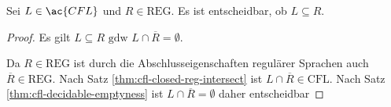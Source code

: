 \begin{Satz}[name={[$L\subseteq R$ entscheidbar]}] %
	Sei $L\in\ac{CFL}$ und $R\in\textrm{REG}$. Es ist entscheidbar, ob $L\subseteq R$.
\end{Satz}
\begin{proof}
  Es gilt $L\subseteq R \text{ gdw } L \cap\overline{R} = \emptyset$.

  Da $R \in \mathrm{REG}$ ist durch die Abschlusseigenschaften regulärer Sprachen auch $\overline{R} \in \mathrm{REG}$.
  Nach Satz \ref{thm:cfl-closed-reg-intersect} ist $L \cap\overline{R} \in \mathrm{CFL}$.
  Nach Satz \ref{thm:cfl-decidable-emptyness} ist $L \cap\overline{R} = \emptyset$ daher entscheidbar
\end{proof}
